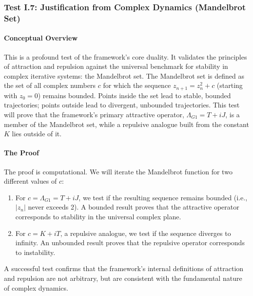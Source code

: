 \subsubsection{Test I.7: Justification from Complex Dynamics (Mandelbrot Set)}
\paragraph{Conceptual Overview}
This is a profound test of the framework's core duality. It validates the principles of attraction and repulsion against the universal benchmark for stability in complex iterative systems: the Mandelbrot set. The Mandelbrot set is defined as the set of all complex numbers $c$ for which the sequence $z_{n+1} = z_n^2 + c$ (starting with $z_0=0$) remains bounded. Points inside the set lead to stable, bounded trajectories; points outside lead to divergent, unbounded trajectories. This test will prove that the framework's primary attractive operator, $\Lambda_{G1} = T+iJ$, is a member of the Mandelbrot set, while a repulsive analogue built from the constant $K$ lies outside of it.

\paragraph{The Proof}
The proof is computational. We will iterate the Mandelbrot function for two different values of $c$:
\begin{enumerate}
    \item  For $c = \Lambda_{G1} = T+iJ$, we test if the resulting sequence remains bounded (i.e., $|z_n|$ never exceeds 2). A bounded result proves that the attractive operator corresponds to stability in the universal complex plane.
    \item For $c = K+iT$, a repulsive analogue, we test if the sequence diverges to infinity. An unbounded result proves that the repulsive operator corresponds to instability.
\end{enumerate}
A successful test confirms that the framework's internal definitions of attraction and repulsion are not arbitrary, but are consistent with the fundamental nature of complex dynamics.

